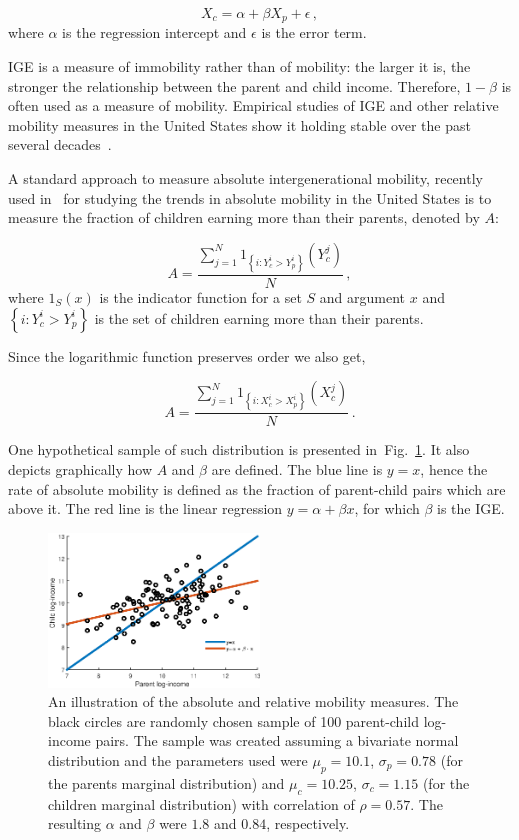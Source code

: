 \documentclass[prl,amsmath,twocolumn,nofootinbib]{revtex4}
\newcommand{\flabel}[1]{\label{fig:#1}}
\newcommand{\fref}[1]{Fig.~\ref{fig:#1}}
\newcommand{\be}{\begin{equation}}
\newcommand{\ee}{\end{equation}}
\numberwithin{equation}{section}
\begin{document}
\be
X_c = \alpha + \beta X_p + \epsilon\,,
\ee
where $\alpha$ is the regression intercept and $\epsilon$ is the error term.

IGE is a measure of immobility rather than of mobility: the larger it is, the stronger the relationship between the parent and child income. Therefore, $1-\beta$ is often used as a measure of mobility. Empirical studies of IGE and other relative mobility measures in the United States show it holding stable over the past several decades~\cite{lee2009trends,hauser2010intergenerational,chetty2014land,chetty2014united}.

A standard approach to measure absolute intergenerational mobility, recently used in~\cite{chetty2017fading} for studying the trends in absolute mobility in the United States is to measure the fraction of children earning more than their parents, denoted by $A$:

\be
A = \frac{\sum_{j=1}^{N}{1_{\left\{i:Y_c^i>Y_p^i\right\}}\left(Y_c^j\right)}}{N}\,,
\ee
where $1_S\left(x\right)$ is the indicator function for a set $S$ and argument $x$ and $\left\{i:Y_c^i>Y_p^i\right\}$ is the set of children earning more than their parents.

Since the logarithmic function preserves order we also get,

\be
A = \frac{\sum_{j=1}^{N}{1_{\left\{i:X_c^i>X_p^i\right\}}\left(X_c^j\right)}}{N}\,.
\ee

One hypothetical sample of such distribution is presented in~\fref{lines}. It also depicts graphically how $A$ and $\beta$ are defined. The blue line is $y=x$, hence the rate of  absolute mobility is defined as the fraction of parent-child pairs which are above it. The red line is the linear regression $y=\alpha +\beta x$, for which $\beta$ is the IGE.

\begin{figure}[!htb]
\centering
\includegraphics[width=0.5\textwidth]{./figs/bivariate_lines3.eps}
\caption{An illustration of the absolute and relative mobility measures. The black circles are randomly chosen sample of 100 parent-child log-income pairs. The sample was created assuming a bivariate normal distribution and the parameters used were $\mu_p=10.1$, $\sigma_p=0.78$ (for the parents marginal distribution) and $\mu_c=10.25$, $\sigma_c=1.15$ (for the children marginal distribution) with correlation of $\rho=0.57$. The resulting $\alpha$ and $\beta$ were $1.8$ and $0.84$, respectively.}
\flabel{lines}
\end{figure}
\end{document}
